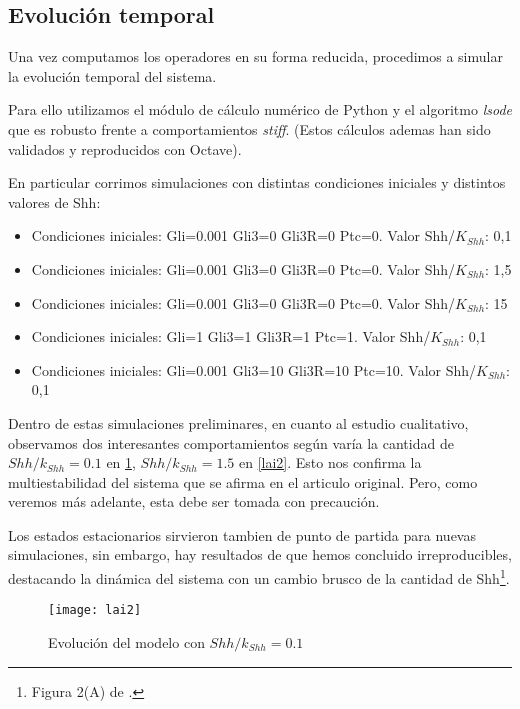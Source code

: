 \subsection{Evolución temporal}
Una vez computamos los operadores en su forma reducida, procedimos a simular la evolución temporal del sistema. 

Para ello utilizamos el módulo de cálculo numérico de Python y el algoritmo \textit{lsode} que es robusto frente a comportamientos \textit{stiff}. (Estos cálculos ademas han sido validados y reproducidos con Octave).

En particular corrimos simulaciones con distintas condiciones iniciales y distintos valores de Shh:

\begin{itemize}
	\item Condiciones iniciales: Gli=0.001 Gli3=0 Gli3R=0 Ptc=0.  Valor Shh/$K_{Shh}$: 0,1
	\item Condiciones iniciales: Gli=0.001 Gli3=0 Gli3R=0 Ptc=0.  Valor Shh/$K_{Shh}$: 1,5
	\item Condiciones iniciales: Gli=0.001 Gli3=0 Gli3R=0 Ptc=0.  Valor Shh/$K_{Shh}$: 15
	\item Condiciones iniciales: Gli=1 Gli3=1 Gli3R=1 Ptc=1.  Valor Shh/$K_{Shh}$: 0,1
	\item Condiciones iniciales: Gli=0.001 Gli3=10 Gli3R=10 Ptc=10.  Valor Shh/$K_{Shh}$: 0,1
\end{itemize}

Dentro de estas simulaciones preliminares, en cuanto al estudio cualitativo, observamos dos interesantes comportamientos según varía la cantidad de $Shh/k_{Shh}=0.1$ en \ref{lai1}, $Shh/k_{Shh}=1.5$ en \ref{lai2}. Esto nos confirma la multiestabilidad del sistema que se afirma en el articulo original. Pero, como veremos más adelante, esta debe ser tomada con precaución.

Los estados estacionarios sirvieron tambien de punto de partida para nuevas simulaciones, sin embargo, hay resultados de \cite{schaffer} que hemos concluido irreproducibles, destacando la dinámica del sistema con un cambio brusco de la cantidad de Shh\footnote{Figura 2(A) de \cite{schaffer}.}. 



 \begin{figure}[h]
 	\texttt{[image: lai2]}
 	\centering
 	\caption{Evolución del modelo \cite{schaffer} con $Shh/k_{Shh}=0.1$ }
 	\label{lai1}
 \end{figure}


